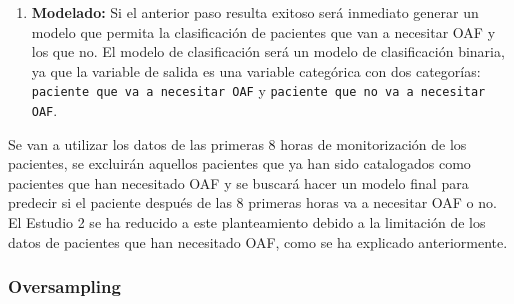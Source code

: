\begin{enumerate}
    Se llevará a cabo la caracterización de los clusters, tomando en consideración las diversas variables descriptivas de cada paciente (edad, género, peso, OAF, ...). Esto se realizará mediante la construcción de un modelo de clasificación discreta, se buscará entender cómo las distintas variables descriptivas influyen en la asignación de etiquetas a los clusters. Este análisis permitirá identificar las variables más influyentes en la distinción de pacientes pertenecientes a los diferentes clusters. Lo ideal en este caso sería observar como en un cluster la variable OAF es la que más influye en la clasificación de los pacientes, ya que esto significaría que los clusters se han formado en función de si el paciente ha necesitado OAF o no. Si esto es así se podría concluir que los clusters obtenidos partiendo de los datos obtenidos de las \textit{Series Temporales} y sus respectivas transformaciones, son capaces de diferenciar a los pacientes que han necesitado OAF de los que no. Respecto a este punto y en último lugar se va a mostrar como se distribuye la importancia de los datos utilizados en función de las etiquetas utilizadas para realizar el \textit{clustering}. En este apartado si los \textit{clusters} generan una muestra de pacientes desbalanceada por grupos se utilizará el método SMOTE para balancearla, esta técnica se explica en la Sección~\ref{sec:oversampling}.
    \item \textbf{Modelado:} Si el anterior paso resulta exitoso será inmediato generar un modelo que permita la clasificación de pacientes que van a necesitar OAF y los que no. El modelo de clasificación será un modelo de clasificación binaria, ya que la variable de salida es una variable categórica con dos categorías: \texttt{paciente que va a necesitar OAF} y \texttt{paciente que no va a necesitar OAF}. 
\end{enumerate}

Se van a utilizar los datos de las primeras $8$ horas de monitorización de los pacientes, se excluirán aquellos pacientes que ya han sido catalogados como pacientes que han necesitado OAF y se buscará hacer un modelo final para predecir si el paciente después de las 8 primeras horas va a necesitar OAF o no. El Estudio 2 se ha reducido a este planteamiento debido a la limitación de los datos de pacientes que han necesitado OAF, como se ha explicado anteriormente.

\subsubsection{Oversampling}\label{sec:oversampling}

